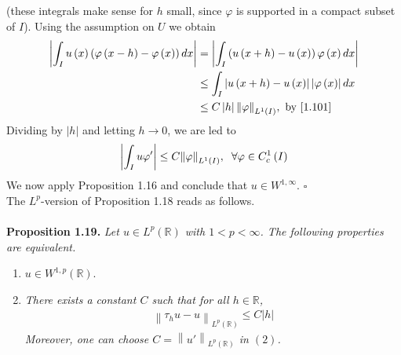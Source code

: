 \documentclass[a4paper,oneside]{article}
\numberwithin{equation}{section}
\begin{document}
(these integrals make sense for $h$ small, since $\varphi$ is supported in a compact subset of $I$). Using the assumption on $U$ we obtain
\begin{align}
\left| {\int_I {u\left( x \right)\left( {\varphi \left( {x - h} \right) - \varphi \left( x \right)} \right)dx} } \right| &= \left| {\int_I {\left( {u\left( {x + h} \right) - u\left( x \right)} \right)\varphi \left( x \right)dx} } \right|\\
& \le \int_I {\left| {u\left( {x + h} \right) - u\left( x \right)} \right|\left| {\varphi \left( x \right)} \right|dx} \\
& \le C\left| h \right|{\left\| \varphi  \right\|_{{L^1}\left( I \right)}},\mbox{ by \eqref{1.101}}
\end{align}
Dividing by $\left| h \right|$ and letting $h\to 0$, we are led to
\begin{align}
\left| {\int_I {u\varphi '} } \right| \le C{\left\| \varphi  \right\|_{{L^1}\left( I \right)}},\hspace{0.2cm}\forall \varphi  \in C_c^1\left( I \right)
\end{align}
We now apply Proposition 1.16 and conclude that $u\in W^{1,\infty}$. \hfill $\square$\\

The $L^p$-version of Proposition 1.18 reads as follows.\\
\\
\textbf{Proposition 1.19.} \textit{Let $u\in L^p\left(\mathbb{R}\right)$ with $1<p<\infty$. The following properties are equivalent.}
\begin{enumerate}
\item $u\in W^{1,p}\left(\mathbb{R}\right)$.
\item \textit{There exists a constant $C$ such that for all $h\in \mathbb{R}$,}
\begin{align}
{\left\| {{\tau _h}u - u} \right\|_{{L^p}\left( \mathbb{R} \right)}} \le C\left| h \right|
\end{align}
\textit{Moreover, one can choose $C = {\left\| {u'} \right\|_{{L^p}\left( \mathbb{R} \right)}}$ in $\left(2\right)$.}
\end{enumerate}
\end{document}
